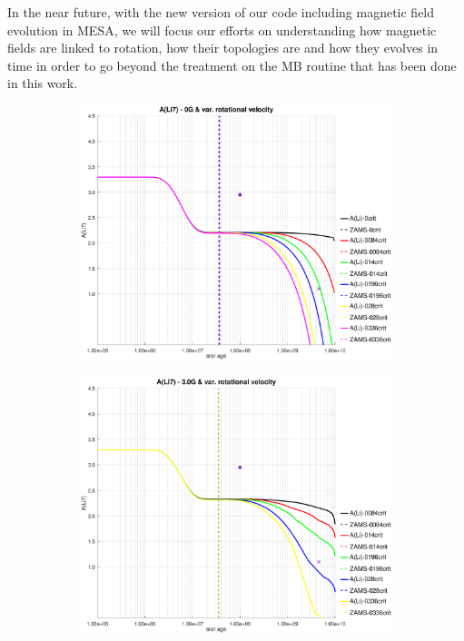 \documentclass[fleqn,usenatbib]{mnras}
\begin{document}
{{In the near future, with the new version of our code including magnetic field evolution in MESA, we will focus our efforts on understanding how magnetic fields are linked to rotation, how their topologies are and how they evolves in time in order to go beyond the treatment on the MB routine that has been done in this work.\par




\begin{figure}
    \centering
    \begin{subfigure}[h]{0.47\textwidth}
    \includegraphics[trim = 35mm 15mm 20mm 15mm, clip,width=\textwidth]{figures/li_var_vel_0_0g.eps}
    \label{fig:subim1}
    \end{subfigure}
    \begin{subfigure}[h]{0.47\textwidth}
    \includegraphics[trim = 35mm 15mm 20mm 15mm, clip,width=\textwidth]{figures/li_var_vel_3_0g.eps}

\end{subfigure}
\end{figure}}}
\end{document}
